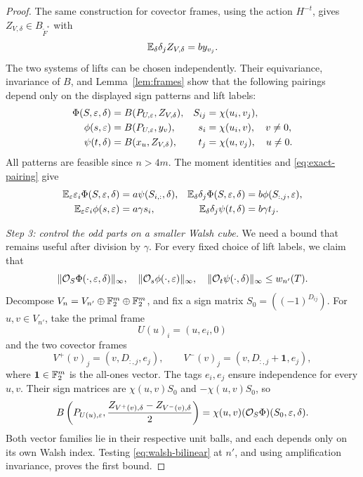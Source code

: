\begin{proof}
The same construction for covector frames, using the action
\(H^{-t}\), gives \(Z_{V,\delta}\in B_{\widetilde F^*}\) with
\[
\mathbb E_\delta\delta_jZ_{V,\delta}=by_{v_j}.
\]
The two systems of lifts can be chosen independently.
Their equivariance, invariance of \(B\), and Lemma~\ref{lem:frames}
show that the following pairings depend only on the displayed sign
patterns and lift labels:
\begin{equation}\label{eq:three-functions}
\begin{aligned}
\Phi(S,\varepsilon,\delta)&=B(P_{U,\varepsilon},Z_{V,\delta}),
& S_{ij}&=\chi(u_i,v_j),\\
\phi(s,\varepsilon)&=B(P_{U,\varepsilon},y_v),
& s_i&=\chi(u_i,v),\quad v\ne0,\\
\psi(t,\delta)&=B(x_u,Z_{V,\delta}),
& t_j&=\chi(u,v_j),\quad u\ne0.
\end{aligned}
\end{equation}
All patterns are feasible since \(n>4m\).
The moment identities and \eqref{eq:exact-pairing} give
\begin{equation}\label{eq:three-moments}
\begin{aligned}
\mathbb E_\varepsilon\varepsilon_i\Phi(S,\varepsilon,\delta)&=a\psi(S_{i,:},\delta),
&
\mathbb E_\delta\delta_j\Phi(S,\varepsilon,\delta)&=b\phi(S_{:,j},\varepsilon),\\
\mathbb E_\varepsilon\varepsilon_i\phi(s,\varepsilon)&=a\gamma s_i,
&
\mathbb E_\delta\delta_j\psi(t,\delta)&=b\gamma t_j.
\end{aligned}
\end{equation}

\medskip
\textit{Step 3: control the odd parts on a smaller Walsh cube.}
We need a bound that remains useful after division by \(\gamma\).
For every fixed choice of lift labels, we claim that
\begin{equation}\label{eq:odd-bounds}
\|\mathcal O_S\Phi(\cdot,\varepsilon,\delta)\|_\infty,\quad
\|\mathcal O_s\phi(\cdot,\varepsilon)\|_\infty,\quad
\|\mathcal O_t\psi(\cdot,\delta)\|_\infty
\le w_{n'}(T).
\end{equation}
Decompose \(V_n=V_{n'}\oplus\mathbb F_2^m\oplus\mathbb F_2^m\), and fix a sign
matrix \(S_0=((-1)^{D_{ij}})\).
For \(u,v\in V_{n'}\), take the primal frame
\[
U(u)_i=(u,e_i,0)
\]
and the two covector frames
\[
V^+(v)_j=(v,D_{:,j},e_j),\qquad
V^-(v)_j=(v,D_{:,j}+\mathbf1,e_j),
\]
where \(\mathbf1\in\mathbb F_2^m\) is the all-ones vector.
The tags \(e_i,e_j\) ensure independence for every \(u,v\).
Their sign matrices are \(\chi(u,v)S_0\) and
\(-\chi(u,v)S_0\), so
\[
B\left(P_{U(u),\varepsilon},
\frac{Z_{V^+(v),\delta}-Z_{V^-(v),\delta}}2\right)
=\chi(u,v)(\mathcal O_S\Phi)(S_0,\varepsilon,\delta).
\]
Both vector families lie in their respective unit balls, and each
depends only on its own Walsh index. Testing
\eqref{eq:walsh-bilinear} at \(n'\), and using amplification
invariance, proves the first bound.


\end{proof}
